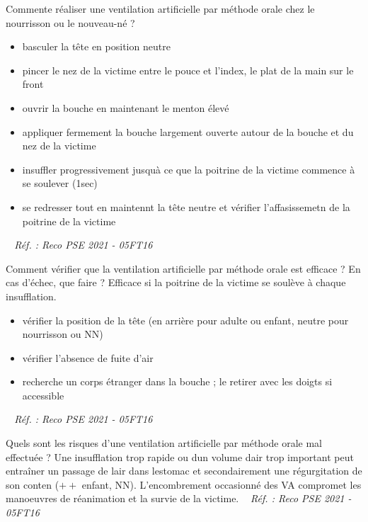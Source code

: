 \documentclass[grid,avery5371,landscape]{flashcards}
\makeatletter
\newcounter{nocarte}
\newcommand{\categ}[1]{%
  \def\@categ{#1}%
  \setcounter{nocarte}{0}%
}
\newcommand{\source}[1]{%
  \medskip
  \itshape%
   ~ \hfill Réf. : #1}
\makeatother
\begin{document}
\color[HTML]{003273}
\categ{PSE}
\begin{flashcard}[geste]{
 Commente réaliser une ventilation artificielle par méthode orale chez le nourrisson ou le nouveau-né ?   }
  \begin{itemize}
\item basculer la tête en position neutre
\item pincer le nez de la victime entre le pouce et l'index, le plat de la main sur le front
\item ouvrir la bouche en maintenant le menton élevé 
\item appliquer fermement la bouche largement ouverte autour de la bouche et du nez de la victime
\item insuffler progressivement jusquà ce que la poitrine de la victime commence à se soulever (1sec)
\item se redresser tout en maintennt la tête neutre et vérifier l'affasissemetn de la poitrine de la victime
\end{itemize}
  \source{Reco PSE 2021 - 05FT16}
\end{flashcard}


\color[HTML]{003273}
\categ{PSE}
\begin{flashcard}[CAT]{
 Comment vérifier que la ventilation artificielle par méthode orale est efficace ? En cas d'échec, que faire ?   }
  Efficace si la poitrine de la victime se soulève à chaque insufflation. \\
\begin{itemize}
\item vérifier la position de la tête (en arrière pour adulte ou enfant, neutre pour nourrisson ou NN)
\item vérifier l'absence de fuite d'air
\item recherche un corps étranger dans la bouche ; le retirer avec les doigts si accessible
\end{itemize}
  \source{Reco PSE 2021 - 05FT16}
\end{flashcard}


\color[HTML]{003273}
\categ{PSE}
\begin{flashcard}[CAT]{
 Quels sont les risques d'une ventilation artificielle par méthode orale mal effectuée ?   }
  Une insufflation trop rapide ou dun volume dair trop important peut entraîner un passage de lair dans lestomac et secondairement une régurgitation de son conten ($++$ enfant, NN). L'encombrement occasionné des VA compromet les manoeuvres de réanimation et la survie de la victime.
  \source{Reco PSE 2021 - 05FT16}
\end{flashcard}
\end{document}
